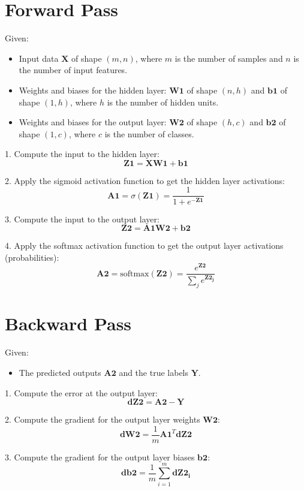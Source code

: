 \documentclass{article}
\begin{document}
	\section*{Forward Pass}
	
	Given:
	\begin{itemize}
		\item Input data $\mathbf{X}$ of shape $(m, n)$, where $m$ is the number of samples and $n$ is the number of input features.
		\item Weights and biases for the hidden layer: $\mathbf{W1}$ of shape $(n, h)$ and $\mathbf{b1}$ of shape $(1, h)$, where $h$ is the number of hidden units.
		\item Weights and biases for the output layer: $\mathbf{W2}$ of shape $(h, c)$ and $\mathbf{b2}$ of shape $(1, c)$, where $c$ is the number of classes.
	\end{itemize}
	
	1. Compute the input to the hidden layer:
	\[
	\mathbf{Z1} = \mathbf{X} \mathbf{W1} + \mathbf{b1}
	\]
	
	2. Apply the sigmoid activation function to get the hidden layer activations:
	\[
	\mathbf{A1} = \sigma(\mathbf{Z1}) = \frac{1}{1 + e^{-\mathbf{Z1}}}
	\]
	
	3. Compute the input to the output layer:
	\[
	\mathbf{Z2} = \mathbf{A1} \mathbf{W2} + \mathbf{b2}
	\]
	
	4. Apply the softmax activation function to get the output layer activations (probabilities):
	\[
	\mathbf{A2} = \text{softmax}(\mathbf{Z2}) = \frac{e^{\mathbf{Z2}}}{\sum_{j} e^{\mathbf{Z2_j}}}
	\]
	
	\section*{Backward Pass}
	
	Given:
	\begin{itemize}
		\item The predicted outputs $\mathbf{A2}$ and the true labels $\mathbf{Y}$.
	\end{itemize}
	
	1. Compute the error at the output layer:
	\[
	\mathbf{dZ2} = \mathbf{A2} - \mathbf{Y}
	\]
	
	2. Compute the gradient for the output layer weights $\mathbf{W2}$:
	\[
	\mathbf{dW2} = \frac{1}{m} \mathbf{A1}^T \mathbf{dZ2}
	\]
	
	3. Compute the gradient for the output layer biases $\mathbf{b2}$:
	\[
	\mathbf{db2} = \frac{1}{m} \sum_{i=1}^{m} \mathbf{dZ2_i}
	\]
	
\end{document}
